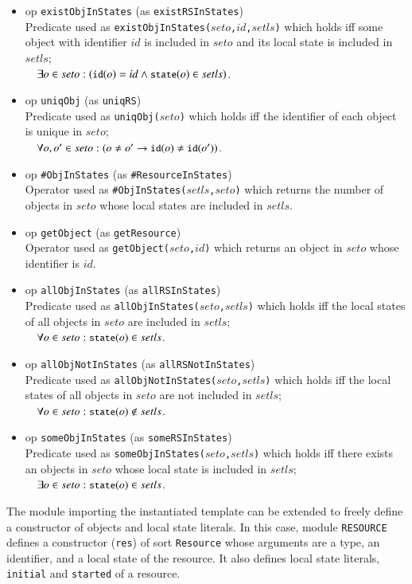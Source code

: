 \documentclass[12pt]{report}
\newcommand{\ra}{\rightarrow}
\newcommand{\mbstt}[1]{\mbox{\small{\tt {#1}}}}
\newcommand{\stt}[1]{{\small{\tt {#1}}}}
\begin{document}
\begin{itemize}
\item op \stt{existObjInStates} (as \stt{existRSInStates})\\
  Predicate used as \stt{existObjInStates($seto$,$id$,$setls$)} which
  holds iff some object with identifier $id$ is included in $seto$ and
  its local state is included in $setls$;\\$~~~~\exists o\in seto:
  (\mbstt{id}(o)=id \land \mbstt{state}(o)\in setls)$.
\item op \stt{uniqObj} (as \stt{uniqRS})\\
  Predicate used as \stt{uniqObj($seto$)} which holds iff the
  identifier of each object is unique in $seto$;\\$~~~~\forall o,o'\in
  seto:(o\ne o'\ra\mbstt{id}(o)\ne\mbstt{id}(o'))$.
\item op \stt{\#ObjInStates} (as \stt{\#ResourceInStates})\\ 
  Operator used as \stt{\#ObjInStates($setls$,$seto$)} which returns
  the number of objects in $seto$ whose local states are
  included in $setls$.
\item op \stt{getObject} (as \stt{getResource})\\ 
  Operator used as \stt{getObject($seto$,$id$)} which returns an
  object in $seto$ whose identifier is $id$.
\item op \stt{allObjInStates} (as \stt{allRSInStates})\\
  Predicate used as \stt{allObjInStates($seto$,$setls$)} which holds iff
  the local states of all objects in $seto$ are included
  in $setls$;\\$~~~~\forall o\in seto:\mbstt{state}(o)\in setls$.
\item op \stt{allObjNotInStates} (as \stt{allRSNotInStates})\\
  Predicate used as \stt{allObjNotInStates($seto$,$setls$)} which holds iff
  the local states of all objects in $seto$ are not included
  in $setls$;\\$~~~~\forall o\in seto:\mbstt{state}(o)\not\in setls$.
\item op \stt{someObjInStates} (as \stt{someRSInStates})\\ 
  Predicate used as \stt{someObjInStates($seto$,$setls$)} which holds
  iff there exists an objects in $seto$ whose local state is included
  in $setls$;\\$~~~~\exists o\in seto:\mbstt{state}(o)\in setls$.
\end{itemize}

The module importing the instantiated template can be extended to
freely define a constructor of objects and local state literals.  In
this case, module {\tt RESOURCE} defines a constructor ({\tt res}) of
sort {\tt Resource} whose arguments are a type, an identifier, and a
local state of the resource. It also defines local state literals,
{\tt initial} and {\tt started} of a resource.
\end{document}
